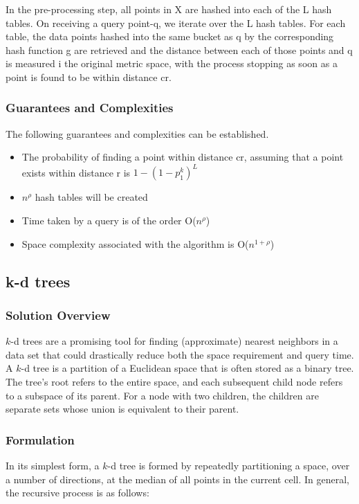 In the pre-processing step, all points in X are hashed into each of the L hash tables. On receiving a query point-q, we iterate over the L hash tables. For each table, the data points hashed into the same bucket as q by the corresponding hash function g are retrieved and the distance between each of those points and q is measured i the original metric space, with the process stopping as soon as a point is found to be within distance cr. 

\subsubsection{Guarantees and Complexities}
The following guarantees and complexities can be established.
\begin{itemize}
    \item The probability of finding a point within distance cr, assuming that a point exists within distance r is $1- (1- p_1^k)^L$
    \item $n^{\rho}$ hash tables will be created
    \item Time taken by a query is of the order O($n^{\rho}$)
    \item Space complexity associated with the algorithm is  O($n^{1+\rho}$)
\end{itemize}


\subsection{k-d trees} %

\subsubsection{Solution Overview}
$k$-d trees are a promising tool for finding (approximate) nearest neighbors in a data set that could drastically reduce both the space requirement and query time. A $k$-d tree is a partition of a Euclidean space that is often stored as a binary tree. The tree's root refers to the entire space, and each subsequent child node refers to a subspace of its parent. For a node with two children, the children are separate sets whose union is equivalent to their parent.

\subsubsection{Formulation}
In its simplest form, a $k$-d tree is formed by repeatedly partitioning a space, over a number of directions, at the median of all points in the current cell. In general, the recursive process is as follows:



